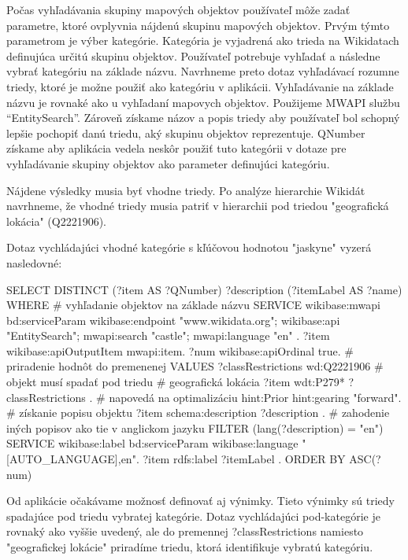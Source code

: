 Počas vyhľadávania skupiny mapových objektov používateľ môže zadať parametre, ktoré ovplyvnia nájdenú skupinu mapových objektov. Prvým týmto parametrom je výber kategórie. Kategória je vyjadrená ako
trieda na Wikidatach definujúca určitú skupinu objektov.
Používateľ potrebuje vyhľadať a následne vybrať kategóriu na základe názvu. Navrhneme preto dotaz vyhľadávací rozumne triedy, ktoré
je možne použiť ako kategóriu v aplikácii.
Vyhľadávanie na základe názvu je rovnaké ako u vyhľadaní mapovych objektov. Použijeme MWAPI službu “EntitySearch”.
Zároveň získame názov a popis triedy aby používateľ bol schopný lepšie pochopiť danú triedu, aký skupinu objektov reprezentuje. QNumber získame
aby aplikácia vedela neskôr použiť tuto kategórii v dotaze pre vyhľadávanie skupiny objektov ako parameter definujúci kategóriu.

Nájdene výsledky musia byť vhodne triedy. Po analýze hierarchie Wikidát navrhneme, že vhodné triedy musia patriť v hierarchii pod triedou "geografická lokácia" (Q2221906).

Dotaz vychládajúci vhodné kategórie s kľúčovou hodnotou "jaskyne" vyzerá nasledovné:
\begin{code}
      SELECT DISTINCT
      (?item AS ?QNumber)
      ?description
      (?itemLabel AS ?name)
      WHERE {
      # vyhľadanie objektov na základe názvu
      SERVICE wikibase:mwapi {
      bd:serviceParam wikibase:endpoint "www.wikidata.org";
      wikibase:api "EntitySearch";
      mwapi:search "castle";
      mwapi:language "en" .
      ?item wikibase:apiOutputItem mwapi:item.
      ?num wikibase:apiOrdinal true. }
      # priradenie hodnôt do premenenej
      VALUES ?classRestrictions {wd:Q2221906  }
      # objekt musí spadať pod triedu
      # geografická lokácia
      ?item wdt:P279* ?classRestrictions .
      # napovedá na optimalizáciu
      hint:Prior hint:gearing "forward".
      # získanie popisu objektu
      ?item schema:description ?description .
      # zahodenie iných popisov ako tie v anglickom jazyku
      FILTER (lang(?description) = "en")
      SERVICE wikibase:label {
      bd:serviceParam wikibase:language "[AUTO_LANGUAGE],en".
      ?item rdfs:label ?itemLabel . }
      } ORDER BY ASC(?num)
\end{code}

Od aplikácie očakávame možnosť definovať aj výnimky. Tieto výnimky sú triedy spadajúce pod triedu vybratej kategórie.
Dotaz vychládajúci pod-kategórie je rovnaký ako vyššie uvedený, ale do premennej ?classRestrictions namiesto "geografickej
lokácie" priradíme triedu, ktorá identifikuje vybratú kategóriu.

